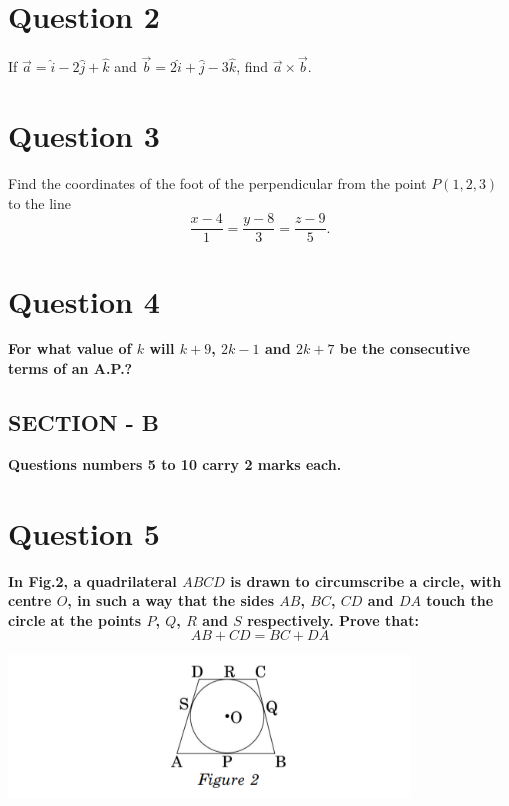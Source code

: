 \documentclass[a4paper,12pt]{article}
\begin{document}
\section*{Question 2}
If $\vec{a} = \hat{i} - 2\hat{j} + \hat{k}$ and $\vec{b} = 2\hat{i} + \hat{j} - 3\hat{k}$, find $\vec{a} \times \vec{b}$.

\section*{Question 3}
Find the coordinates of the foot of the perpendicular from the point $P(1, 2, 3)$ to the line
\[
\frac{x - 4}{1} = \frac{y - 8}{3} = \frac{z - 9}{5}.
\]

\section*{Question 4}
\textbf{For what value of $k$ will $k+9$, $2k - 1$ and $2k + 7$ be the consecutive terms of an A.P.?}

\vspace{1cm}

\begin{center}
    \section*{\large \textbf{SECTION - B}} 
    \textbf{Questions numbers 5 to 10 carry 2 marks each.}
\end{center}

\vspace{0.5cm}

\section*{Question 5}
\textbf{In Fig.2, a quadrilateral $ABCD$ is drawn to circumscribe a circle, with centre $O$, in such a way that the sides $AB$, $BC$, $CD$ and $DA$ touch the circle at the points $P$, $Q$, $R$ and $S$ respectively. Prove that:}
\[
AB + CD = BC + DA
\]

\begin{center}
    \includegraphics[width=0.8\textwidth]{q5.png} \\
    
\end{center}
\end{document}
